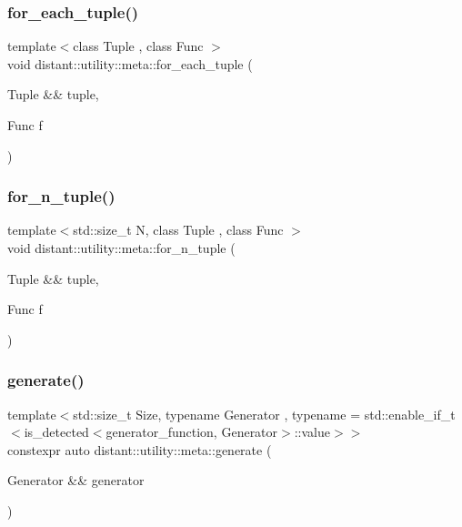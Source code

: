 \subsubsection{\texorpdfstring{for\+\_\+each\+\_\+tuple()}{for\_each\_tuple()}}
{\footnotesize\ttfamily template$<$class Tuple , class Func $>$ \\
void distant\+::utility\+::meta\+::for\+\_\+each\+\_\+tuple (\begin{DoxyParamCaption}\item[{Tuple \&\&}]{tuple,  }\item[{Func}]{f }\end{DoxyParamCaption})\hspace{0.3cm}{\ttfamily [noexcept]}}

\mbox{\label{namespacedistant_1_1utility_1_1meta_af56486a77acac37cd3409468d35bd69b}} 
\subsubsection{\texorpdfstring{for\+\_\+n\+\_\+tuple()}{for\_n\_tuple()}}
{\footnotesize\ttfamily template$<$std\+::size\+\_\+t N, class Tuple , class Func $>$ \\
void distant\+::utility\+::meta\+::for\+\_\+n\+\_\+tuple (\begin{DoxyParamCaption}\item[{Tuple \&\&}]{tuple,  }\item[{Func}]{f }\end{DoxyParamCaption})\hspace{0.3cm}{\ttfamily [noexcept]}}

\mbox{\label{namespacedistant_1_1utility_1_1meta_a2f4bc82868002f3838262b733bf762a0}} 
\subsubsection{\texorpdfstring{generate()}{generate()}}
{\footnotesize\ttfamily template$<$std\+::size\+\_\+t Size, typename Generator , typename  = std\+::enable\+\_\+if\+\_\+t$<$is\+\_\+detected$<$generator\+\_\+function, Generator$>$\+::value$>$$>$ \\
constexpr auto distant\+::utility\+::meta\+::generate (\begin{DoxyParamCaption}\item[{Generator \&\&}]{generator }\end{DoxyParamCaption})\hspace{0.3cm}{\ttfamily [noexcept]}}

